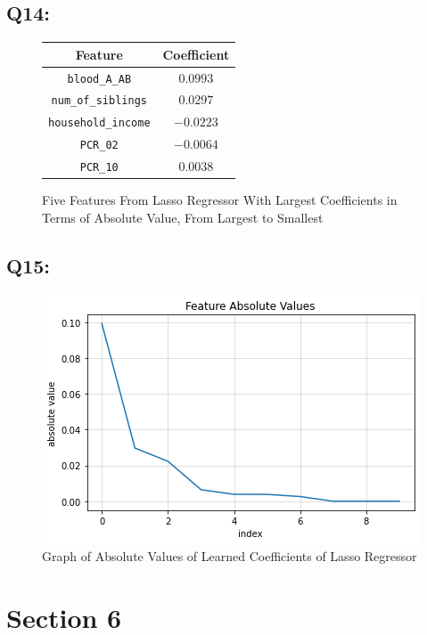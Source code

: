\documentclass{article}
\newcommand{\code}[1]{\texttt{#1}}
\begin{document}
\subsection*{Q14:}
    \begin{figure}[H]
        \centering
        \begin{tabular}{|c|c|}
            \hline
            \rowcolor{gray!60}
            Feature & Coefficient \\ \hline
            \code{blood\_A\_AB} & $0.0993$ \\ \hline
            \code{num\_of\_siblings} & $0.0297$ \\ \hline
            \code{household\_income} & $-0.0223$ \\ \hline
            \code{PCR\_02} & $-0.0064$ \\ \hline
            \code{PCR\_10} & $0.0038$ \\ \hline
        \end{tabular}
        \caption{Five Features From Lasso Regressor With Largest Coefficients in Terms of Absolute Value, From Largest to Smallest}
    \end{figure}
\subsection*{Q15:}
    \begin{figure}[H]
        \centering
        \includegraphics[scale=0.7]{q15.png}
        \caption{Graph of Absolute Values of Learned Coefficients of Lasso Regressor}
        \label{fig:q15}
    \end{figure}
    \paragraph*{}

\section*{Section 6}
\end{document}
